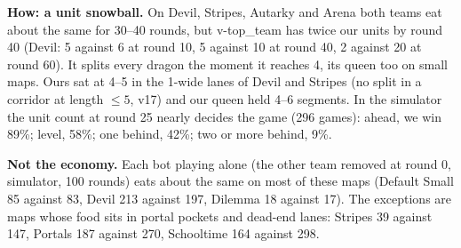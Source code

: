 \documentclass[11pt,a4paper]{article}
\begin{document}
\textbf{How: a unit snowball.} On Devil, Stripes, Autarky and Arena both teams eat about the same for 30--40 rounds, but
v-top\_team has twice our units by round 40 (Devil: 5 against 6 at round 10, 5 against 10 at round 40, 2 against 20 at round
60). It splits every dragon the moment it reaches 4, its queen too on small maps. Ours sat at 4--5 in the 1-wide lanes of
Devil and Stripes (no split in a corridor at length $\leq 5$, v17) and our queen held 4--6 segments. In the simulator the unit
count at round 25 nearly decides the game (296 games): ahead, we win 89\%; level, 58\%; one behind, 42\%; two or more
behind, 9\%.

\textbf{Not the economy.} Each bot playing alone (the other team removed at round 0, simulator, 100 rounds) eats about the
same on most of these maps (Default Small 85 against 83, Devil 213 against 197, Dilemma 18 against 17). The exceptions are
maps whose food sits in portal pockets and dead-end lanes: Stripes 39 against 147, Portals 187 against 270, Schooltime 164
against 298.
\end{document}
